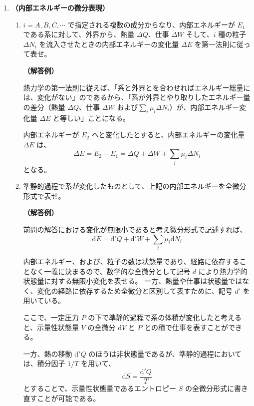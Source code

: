 \documentclass[uplatex,dvipdfmx,a4paper,11pt]{jsarticle}
\newcommand{\diff}{\mathrm d}
\begin{document}
\begin{appendix}
\begin{enumerate}
\begin{enumerate}
\end{enumerate}

\item
{\bf （内部エネルギーの微分表現）}

\begin{enumerate}
\item
$i = A, B, C, \cdots$ で指定される複数の成分からなり、内部エネルギーが $E_1$ である系に対して、外界から、熱量 $\Delta Q$、仕事 $\Delta W$ そして、$i$ 種の粒子 $\Delta N_i$ を流入させたときの内部エネルギーの変化量 $\Delta E$ を第一法則に従って表せ。

{\bf （解答例）} 

熱力学の第一法則に従えば、「系と外界とを合わせればエネルギー総量には、変化がない」のであるから、「系が外界とやり取りしたエネルギー量の差分（熱量 $\Delta Q$、仕事 $\Delta W$ および$\sum_i \mu_i \Delta N_i$）が、内部エネルギー変化量 $\Delta E$ と等しい」ことになる。

内部エネルギーが $E_2$ へと変化したとすると、内部エネルギーの変化量 $\Delta E$ は、
\begin{equation*}
\Delta E = E_2 -E_1 = \Delta Q + \Delta W + \sum_i \mu_i \Delta N_i
\end{equation*}
となる。

\item
準静的過程で系が変化したものとして、上記の内部エネルギーを全微分形式で表せ。

{\bf （解答例）} 

前問の解答における変化が無限小であると考え微分形式で記述すれば、
\begin{equation*}
\diff E = \diff' Q + \diff' W + \sum_i \mu_i \diff N_i
\end{equation*}

内部エネルギー、および、粒子の数は状態量であり、経路に依存することなく一義に決まるので、数学的な全微分として記号 $d$ により熱力学的状態量に対する無限小変化を表せる。
一方、熱量や仕事は状態量ではなく、変化の経路に依存するため全微分と区別して表すために、記号 $d'$ を用いている。

ここで、一定圧力 $P$ の下で準静的過程で系の体積が変化したと考えると、示量性状態量 $V$ の全微分 $\diff V$ と $P$ との積で仕事を表すことができる。

一方、熱の移動 $\diff' Q$ のほうは非状態量であるが、準静的過程においては、積分因子 $1/T$ を用いて、
\begin{equation*}
\diff S = \dfrac{\diff' Q}{T}
\end{equation*}
とすることで、示量性状態量であるエントロピー $S$ の全微分形式に書き直すことが可能である。


\end{enumerate}
\end{enumerate}
\end{appendix}
\end{document}
